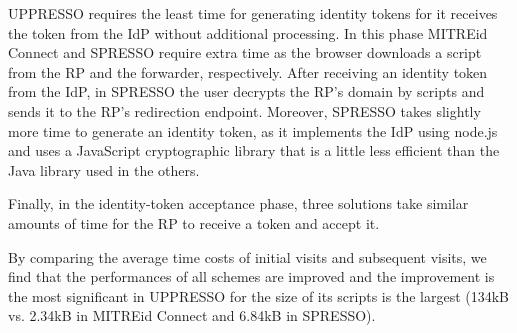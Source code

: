 UPPRESSO requires the least time for generating identity tokens for it receives the token from the IdP without additional processing.
In this phase MITREid Connect and SPRESSO require extra time as the browser downloads a script from the RP and the forwarder, respectively. %
After receiving an identity token from the IdP, in SPRESSO the user decrypts the RP's domain by scripts and sends it to the RP's redirection endpoint.
Moreover, SPRESSO takes slightly more time to generate an identity token, as it implements the IdP using node.js and uses a JavaScript cryptographic library that is a little less efficient than the Java library used in the others.

Finally, in the identity-token acceptance phase, 
three solutions take similar amounts of time for the RP to receive a token and accept it.


By comparing the average time costs of initial visits and subsequent visits,
    we find that the performances of all schemes are improved
        and the improvement is the most significant in UPPRESSO for the size of its scripts is the largest (134kB vs. 2.34kB in MITREid Connect and 6.84kB in SPRESSO). 